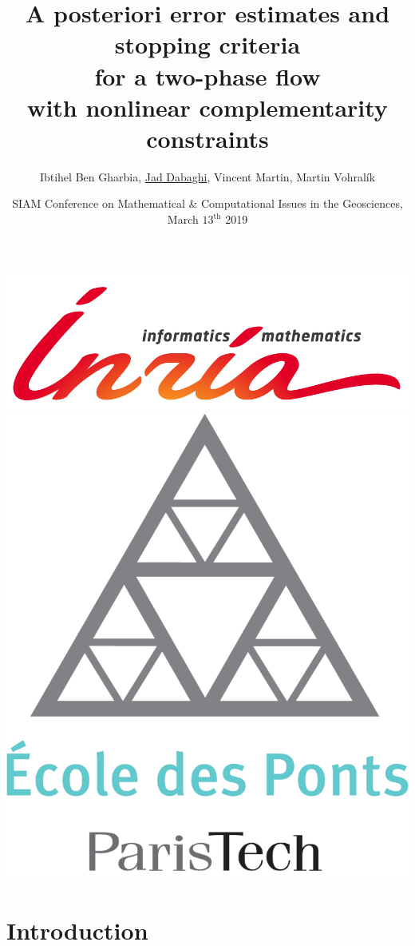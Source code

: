 \documentclass[10 pt]{beamer}
\title[SIAM GS 2019]{A posteriori error estimates and stopping criteria\\ for a two-phase flow\\ with nonlinear complementarity constraints}
\author[Jad Dabaghi]
{Ibtihel Ben Gharbia, \underline{Jad Dabaghi}, Vincent Martin, Martin Vohral\'ik}
\institute[]{Inria Paris \& Université Paris-Est}
\date{SIAM Conference on Mathematical \& Computational Issues in the Geosciences, March $13^{\mathrm{th}}$ 2019}
\begin{document}
\begin{frame}
\maketitle
\includegraphics[scale=0.3]{INRIA-SCIENTIFIQUE-UK-RVB}
\hfill \includegraphics[scale=0.08]{Logo_ponts_paristech}

\end{frame}




\newcommand{\kk}{\textcolor{royalblue}{k}}
\newcommand{\ii}{\textcolor{burntorange}{i}}
\newcommand{\nuu}{\textcolor{burntorange}{\nu}}


\setcounter{tocdepth}{4}
\section{Introduction}
\end{document}

